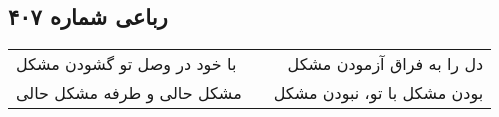 \begin{center}
\section*{رباعی شماره ۴۰۷}
\label{sec:sh407}
\begin{longtable}{l p{0.5cm} r}
با خود در وصل تو گشودن مشکل
&&
دل را به فراق آزمودن مشکل
\\
مشکل حالی و طرفه مشکل حالی
&&
بودن مشکل با تو، نبودن مشکل
\\
\end{longtable}
\end{center}
